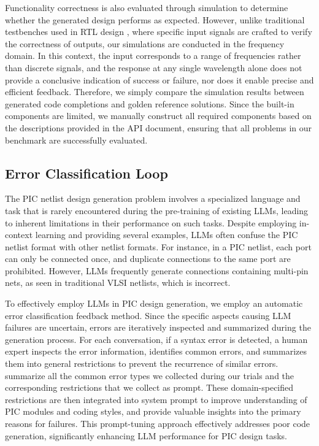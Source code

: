 Functionality correctness is also evaluated through simulation to determine whether the generated design performs as expected.
However, unlike traditional testbenches used in RTL design \cite{lu2024rtllm}, where specific input signals are crafted to verify the correctness of outputs, our simulations are conducted in the frequency domain.
In this context, the input corresponds to a range of frequencies rather than discrete signals, and the response at any single wavelength alone does not provide a conclusive indication of success or failure, nor does it enable precise and efficient feedback.
Therefore, we simply compare the simulation results between generated code completions and golden reference solutions.
Since the built-in components are limited, we manually construct all required components based on the descriptions provided in the API document, ensuring that all problems in our benchmark are successfully evaluated.

\subsection{Error Classification Loop}
\label{sec:Error_class}
The PIC netlist design generation problem involves a specialized language and task that is rarely encountered during the pre-training of existing LLMs, leading to inherent limitations in their performance on such tasks. 
Despite employing in-context learning and providing several examples, LLMs often confuse the PIC netlist format with other netlist formats. 
For instance, in a PIC netlist, each port can only be connected once, and duplicate connections to the same port are prohibited. 
However, LLMs frequently generate connections containing multi-pin nets, as seen in traditional VLSI netlists, which is incorrect.

To effectively employ LLMs in PIC design generation, we employ an automatic error classification feedback method. 
Since the specific aspects causing LLM failures are uncertain, errors are iteratively inspected and summarized during the generation process. 
For each conversation, if a syntax error is detected, a human expert inspects the error information, identifies common errors, and summarizes them into general restrictions to prevent the recurrence of similar errors.
 summarize all the common error types we collected during our trials and the corresponding restrictions that we collect as prompt.
These domain-specified restrictions are then integrated into system prompt to improve understanding of PIC modules and coding styles, and provide valuable insights into the primary reasons for failures.
This prompt-tuning approach effectively addresses poor code generation, significantly enhancing LLM performance for PIC design tasks.

